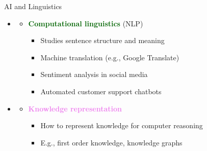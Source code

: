\documentclass[
  10pt,
  ignorenonframetext,
]{beamer}
\providecommand{\tightlist}{%
  \setlength{\itemsep}{0pt}\setlength{\parskip}{0pt}}
\begin{document}
\begin{frame}{AI and Linguistics}
\label{ai-and-linguistics}
\begin{itemize}
\tightlist
\item
  \textbf{\textcolor{red}{\textcolor{black}{}}}

  \begin{itemize}
  \tightlist
  \item
    \textbf{\textcolor{darkgreen}{Computational linguistics}} (NLP)

    \begin{itemize}
    \tightlist
    \item
      Studies sentence structure and meaning
    \item
      Machine translation (e.g., Google Translate)
    \item
      Sentiment analysis in social media
    \item
      Automated customer support chatbots
    \end{itemize}
  \end{itemize}
\item
  \textbf{\textcolor{blue}{\textcolor{black}{}}}

  \begin{itemize}
  \tightlist
  \item
    \textbf{\textcolor{violet}{Knowledge representation}}

    \begin{itemize}
    \tightlist
    \item
      How to represent knowledge for computer reasoning
    \item
      E.g., first order knowledge, knowledge graphs
    \end{itemize}
  \end{itemize}
\end{itemize}
\end{frame}
\end{document}
